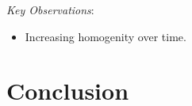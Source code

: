 \documentclass[12pt, a4paper]{article} %
\begin{document}
\noindent \textit{Key Observations}:
\begin{itemize}
\item Increasing homogenity over time.
\end{itemize}


\section{Conclusion}





\newpage
\printbibliography[
heading=bibintoc,
title={Bibliography}
]



\end{document}
